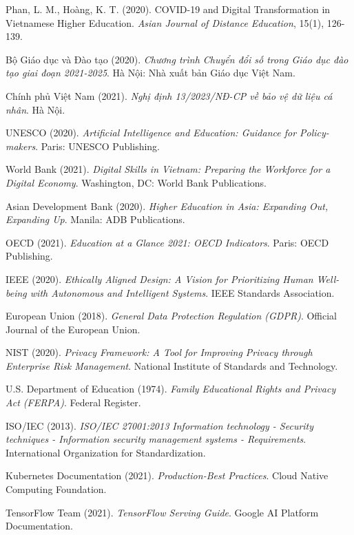 \documentclass[12pt,a4paper]{report}
\begin{document}
\begin{thebibliography}{50}
Phan, L. M., Hoàng, K. T. (2020). COVID-19 and Digital Transformation in Vietnamese Higher Education. \textit{Asian Journal of Distance Education}, 15(1), 126-139.

Bộ Giáo dục và Đào tạo (2020). \textit{Chương trình Chuyển đổi số trong Giáo dục đào tạo giai đoạn 2021-2025}. Hà Nội: Nhà xuất bản Giáo dục Việt Nam.

Chính phủ Việt Nam (2021). \textit{Nghị định 13/2023/NĐ-CP về bảo vệ dữ liệu cá nhân}. Hà Nội.

UNESCO (2020). \textit{Artificial Intelligence and Education: Guidance for Policy-makers}. Paris: UNESCO Publishing.

World Bank (2021). \textit{Digital Skills in Vietnam: Preparing the Workforce for a Digital Economy}. Washington, DC: World Bank Publications.

Asian Development Bank (2020). \textit{Higher Education in Asia: Expanding Out, Expanding Up}. Manila: ADB Publications.

OECD (2021). \textit{Education at a Glance 2021: OECD Indicators}. Paris: OECD Publishing.

IEEE (2020). \textit{Ethically Aligned Design: A Vision for Prioritizing Human Well-being with Autonomous and Intelligent Systems}. IEEE Standards Association.

European Union (2018). \textit{General Data Protection Regulation (GDPR)}. Official Journal of the European Union.

NIST (2020). \textit{Privacy Framework: A Tool for Improving Privacy through Enterprise Risk Management}. National Institute of Standards and Technology.

U.S. Department of Education (1974). \textit{Family Educational Rights and Privacy Act (FERPA)}. Federal Register.

ISO/IEC (2013). \textit{ISO/IEC 27001:2013 Information technology - Security techniques - Information security management systems - Requirements}. International Organization for Standardization.

Kubernetes Documentation (2021). \textit{Production-Best Practices}. Cloud Native Computing Foundation.

TensorFlow Team (2021). \textit{TensorFlow Serving Guide}. Google AI Platform Documentation.


\end{thebibliography}
\end{document}
